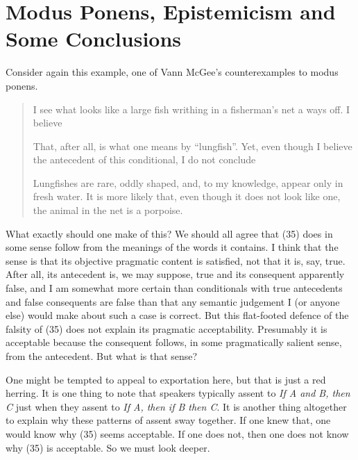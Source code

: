 \section{Modus Ponens, Epistemicism and Some Conclusions}

Consider again this example, one of Vann McGee's counterexamples to modus ponens. \citep[463; the numbering is not in the original]{McGee1985}

\begin{quote}
I see what looks like a large fish writhing in a fisherman's net a ways off. I believe


\noindent That, after all, is what one means by ``lungfish''. Yet, even though I believe the antecedent of this conditional, I do not conclude


\noindent Lungfishes are rare, oddly shaped, and, to my knowledge, appear only in fresh water. It is more likely that, even though it does not look like one, the animal in the net is a porpoise.
\end{quote}

\noindent What exactly should one make of this? We should all agree that (35) does in some sense follow from the meanings of the words it contains. I think that the sense is that its objective pragmatic content is satisfied, not that it is, say, true. After all, its antecedent is, we may suppose, true and its consequent apparently false, and I am somewhat more certain than conditionals with true antecedents and false consequents are false than that any semantic judgement I (or anyone else) would make about such a case is correct. But this flat-footed defence of the falsity of (35) does not explain its pragmatic acceptability. Presumably it is acceptable because the consequent follows, in some pragmatically salient sense, from the antecedent. But what is that sense?

One might be tempted to appeal to exportation here, but that is just a red herring. It is one thing to note that speakers typically assent to \textit{If A and B, then C} just when they assent to \textit{If A, then if B then C}. It is another thing altogether to explain why these patterns of assent sway together. If one knew that, one would know why (35) seems acceptable. If one does not, then one does not know why (35) is acceptable. So we must look deeper.

